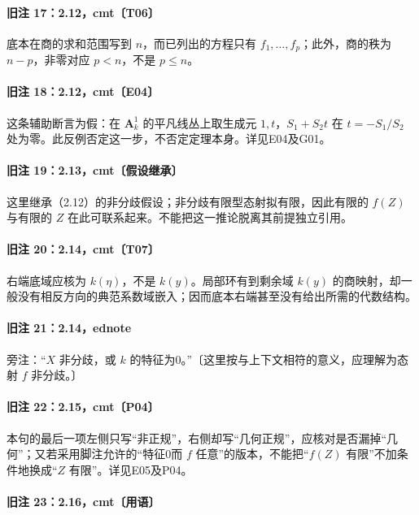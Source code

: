 \paragraph{旧注 17：2.12，cmt〔T06〕}

底本在商的求和范围写到 $n$，而已列出的方程只有 $f_1,\ldots,f_p$；此外，商的秩为 $n-p$，非零对应 $p<n$，不是 $p\leq n$。

\paragraph{旧注 18：2.12，cmt〔E04〕}

这条辅助断言为假：在 $\mathbf A^1_k$ 的平凡线丛上取生成元 $1,t$，$S_1+S_2t$ 在 $t=-S_1/S_2$ 处为零。此反例否定这一步，不否定定理本身。详见E04及G01。

\paragraph{旧注 19：2.13，cmt〔假设继承〕}

这里继承（2.12）的非分歧假设；非分歧有限型态射拟有限，因此有限的 $f(Z)$ 与有限的 $Z$ 在此可联系起来。不能把这一推论脱离其前提独立引用。

\paragraph{旧注 20：2.14，cmt〔T07〕}

右端底域应核为 $k(\eta)$，不是 $k(y)$。局部环有到剩余域 $k(y)$ 的商映射，却一般没有相反方向的典范系数域嵌入；因而底本右端甚至没有给出所需的代数结构。

\paragraph{旧注 21：2.14，ednote}

旁注：“$X$ 非分歧，或 $k$ 的特征为0。”〔这里按与上下文相符的意义，应理解为态射 $f$ 非分歧。〕

\paragraph{旧注 22：2.15，cmt〔P04〕}

本句的最后一项左侧只写“非正规”，右侧却写“几何正规”，应核对是否漏掉“几何”；又若采用脚注允许的“特征0而 $f$ 任意”的版本，不能把“$f(Z)$ 有限”不加条件地换成“$Z$ 有限”。详见E05及P04。

\paragraph{旧注 23：2.16，cmt〔用语〕}


